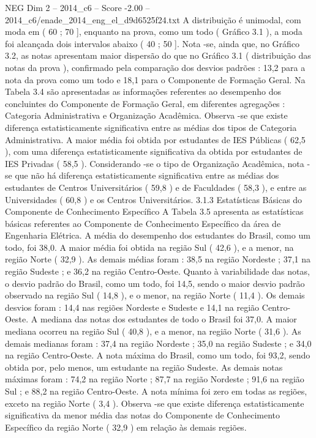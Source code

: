 \begin{textsample}{NEG Dim 2 – 2014\_c6 – Score -2.00 – 2014\_c6/enade\_2014\_eng\_el\_d9d6525f24.txt}
A distribuição é unimodal, com moda em ( 60 ; 70 ], enquanto na prova, como um todo ( Gráfico 3.1 ), a moda foi alcançada dois intervalos abaixo ( 40 ; 50 ].
Nota -se, ainda que, no Gráfico 3.2, as notas apresentam maior dispersão do que no Gráfico 3.1 ( distribuição das notas da prova ), confirmado pela comparação dos desvios padrões : 13,2 para a nota da prova como um todo e 18,1 para o Componente de Formação Geral.
Na Tabela 3.4 são apresentadas as informações referentes ao desempenho dos concluintes do Componente de Formação Geral, em diferentes agregações : Categoria Administrativa e Organização Acadêmica.
Observa -se que existe diferença estatisticamente significativa entre as médias dos tipos de Categoria Administrativa.
A maior média foi obtida por estudantes de IES Públicas ( 62,5 ), com uma diferença estatisticamente significativa da obtida por estudantes de IES Privadas ( 58,5 ).
Considerando -se o tipo de Organização Acadêmica, nota -se que não há diferença estatisticamente significativa entre as médias dos estudantes de Centros Universitários ( 59,8 ) e de Faculdades ( 58,3 ), e entre as Universidades ( 60,8 ) e os Centros Universitários. 3.1.3 Estatísticas Básicas do Componente de Conhecimento Específico A Tabela 3.5 apresenta as estatísticas básicas referentes ao Componente de Conhecimento Específico da área de Engenharia Elétrica.
A média do desempenho dos estudantes do Brasil, como um todo, foi 38,0.
A maior média foi obtida na região Sul ( 42,6 ), e a menor, na região Norte ( 32,9 ).
As demais médias foram : 38,5 na região Nordeste ; 37,1 na região Sudeste ; e 36,2 na região Centro-Oeste.
Quanto à variabilidade das notas, o desvio padrão do Brasil, como um todo, foi 14,5, sendo o maior desvio padrão observado na região Sul ( 14,8 ), e o menor, na região Norte ( 11,4 ).
Os demais desvios foram : 14,4 nas regiões Nordeste e Sudeste e 14,1 na região Centro-Oeste.
A mediana das notas dos estudantes de todo o Brasil foi 37,0.
A maior mediana ocorreu na região Sul ( 40,8 ), e a menor, na região Norte ( 31,6 ).
As demais medianas foram : 37,4 na região Nordeste ; 35,0 na região Sudeste ; e 34,0 na região Centro-Oeste.
A nota máxima do Brasil, como um todo, foi 93,2, sendo obtida por, pelo menos, um estudante na região Sudeste.
As demais notas máximas foram : 74,2 na região Norte ; 87,7 na região Nordeste ; 91,6 na região Sul ; e 88,2 na região Centro-Oeste.
A nota mínima foi zero em todas as regiões, exceto na região Norte ( 3,4 ).
Observa -se que existe diferença estatisticamente significativa da menor média das notas do Componente de Conhecimento Específico da região Norte ( 32,9 ) em relação às demais regiões.

\end{textsample}
